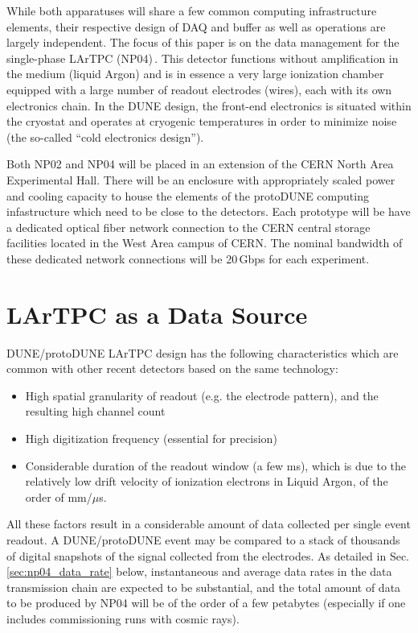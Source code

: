 \documentclass[a4paper]{jpconf}
\newcommand{\pd}{protoDUNE\xspace}
\begin{document}
While both apparatuses will share a few common computing infrastructure elements, their
respective design of DAQ and buffer as well as operations are largely independent.
The focus of this paper is on the data management for the
single-phase LArTPC (NP04)\,\cite{np04}. This detector  functions without amplification in the medium
(liquid Argon) and is in essence a very large ionization chamber equipped with a large
number of readout electrodes (wires), each with its own electronics chain.
In the DUNE design, the front-end electronics is situated within the cryostat and operates at cryogenic
temperatures in order to minimize noise (the so-called ``cold electronics design'').

Both NP02 and NP04 will be placed in an extension of the CERN North Area Experimental Hall.
There will be an enclosure with appropriately scaled power and cooling capacity to house the elements
of the \pd computing infastructure which need to be close to the detectors.
Each prototype will be have a dedicated optical fiber network connection to the CERN central storage facilities
located in the West Area campus of CERN. The nominal bandwidth of these dedicated network connections
will be 20\,Gbps for each experiment.


\section{LArTPC as a Data Source}

DUNE/\pd LArTPC design has the following characteristics which are common with
other recent detectors based on the same technology:
\begin{itemize}
\item High spatial granularity of readout (e.g. the electrode pattern), and the resulting high channel count
\item High digitization frequency (essential for precision)
\item Considerable duration of the readout window (a few ms), which is due to the relatively
low drift velocity of ionization electrons in Liquid Argon, of the order of mm/$\mu$s.
\end{itemize}

\noindent All these factors result in a considerable amount of data collected per single event readout.
A DUNE/\pd event may be compared to a stack of thousands of digital  snapshots of the signal
collected from the electrodes.  As detailed in Sec.\,\ref{sec:np04_data_rate} below,
instantaneous and average data rates in the data transmission chain are expected to be substantial, 
and the total amount of data to be produced by NP04 will be of the order of a few
petabytes (especially if one includes commissioning runs with cosmic rays).
\end{document}
